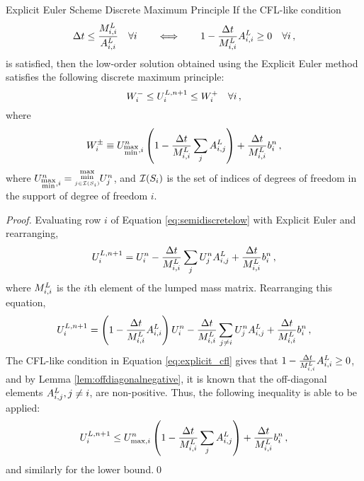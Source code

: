 \begin{theorem}{Explicit Euler Scheme Discrete
  Maximum Principle}
If the CFL-like condition
\begin{equation}\label{eq:explicit_cfl}
   \Delta t \leq \frac{M_{i,i}^L}{A_{i,i}^L}
   \quad\forall i
   \qquad\Longleftrightarrow\qquad
   1 - \frac{\Delta t}{M_{i,i}^L}A_{i,i}^L
     \geq 0\quad\forall i \,,
\end{equation}
is satisfied, then the low-order solution obtained using the Explicit Euler
method satisfies the following discrete maximum principle:
\begin{equation}\label{eq:explicit_dmp}
   W_i^-\leq U_i^{L,n+1}\leq W_i^+\quad\forall i
   \,,
\end{equation}
where
\begin{equation}\label{eq:explicit_bounds}
   W_i^\pm\equiv U_{\substack{\max\\\min},i}^n
     \left(1-\frac{\Delta t}{M_{i,i}^L}
       \sum\limits_jA^L_{i,j}\right)
     + \frac{\Delta t}{M_{i,i}^L}b_i^n \,,
\end{equation}
where $\solutionletter_{\substack{\max\\\min},i}^n =
\substack{\max\\\min\limits_{j\in\indicescell[\support_i]}}\solutionletter_j^n$,
and $\indicescell[\support_i]$ is the set of indices of degrees of freedom in the
support of degree of freedom $i$.
\end{theorem}

\begin{proof}
Evaluating row $i$ of Equation \eqref{eq:semidiscretelow} with Explicit Euler
and rearranging,
\[
   U_i^{L,n+1}
   = U_i^n
   - \frac{\Delta t}{M_{i,i}^L}
       \sum\limits_jU_j^n A^L_{i,j}
   + \frac{\Delta t}{M_{i,i}^L}b_i^n \,,
\]
where $M_{i,i}^L$ is the $i$th element of the lumped mass matrix.
Rearranging this equation,
\[
   U_i^{L,n+1}
   = \left(1-\frac{\Delta t}{M_{i,i}^L}
       A^L_{i,i}\right)U_i^n
   - \frac{\Delta t}{M_{i,i}^L}
       \sum\limits_{j\ne i}U_j^n A^L_{i,j}
   + \frac{\Delta t}{M_{i,i}^L}b_i^n \,,
\]
The CFL-like condition in Equation \eqref{eq:explicit_cfl} gives that
$1-\frac{\Delta t}{M_{i,i}^L}A^L_{i,i} \ge
0$, and by Lemma \ref{lem:offdiagonalnegative}, it is known that the
off-diagonal elements $A^L_{i,j}, j\ne i$, are non-positive.
Thus, the following inequality is able to be applied:
\[
   U_i^{L,n+1}
   \le U_{\max,i}^n
         \left(1-\frac{\Delta t}{M_{i,i}^L}
         \sum\limits_jA^L_{i,j}\right)
   + \frac{\Delta t}{M_{i,i}^L}b_i^n \,,
\]
and similarly for the lower bound.\qed
\end{proof}
